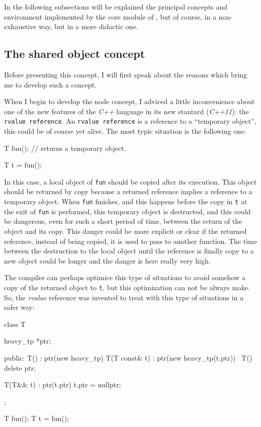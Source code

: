 \documentclass{article}
\begin{document}
In the following subsections will be explained the principal concepts and
environment implemented by the core module of \fav, but of course, in a
non-exhaustive way, but in a more didactic one.

\subsection{The shared object concept}
Before presenting this concept, I will first speak about the reasons which bring
me to develop such a concept.

When I begin to develop the node concept, I adviced a little inconvenience about
one of the new features of the \textit{C++} language in its new stantard
(\textit{C++11}): the \texttt{rvalue reference}. An \texttt{rvalue reference} is a
reference to a ``temporary object'', this could be of course yet alive. The most
typic situation is the following one:

\begin{Cpp}
  T fun();
  // returns a temporary object.

  T t = fun();
\end{Cpp}

In this case, a local object of \texttt{fun} should be copied after its
execution. This object should be returned by copy because a returned reference
implies a reference to a temporary object. When \texttt{fun} finishes, and this
happens before the copy in \texttt{t} at the exit of \texttt{fun} is performed,
this temporary object is destructed, and this could be dangerous, even for such
a short period of time, between the return of the object and its copy. This
danger could be more explicit or clear if the returned reference, instead of
being copied, it is used to pass to another function. The time between the
destruction to the local object until the reference is finally copy to a new
object could be longer and the danger is here really very high.

The compiler can perhaps optimice this type of situations to avoid somehow a
copy of the returned object to \texttt{t}, but this optimization can not be
always make. So, the \textit{rvalue} reference was invented to treat with this
type of situations in a safer way:

\begin{Cpp}
   class T {
      heavy_tp *ptr;

   public:
      T() : ptr(new heavy_tp) {}
      T(T const& t) : ptr(new heavy_tp(t.ptr)) {}
      ~T() { delete ptr; }

      T(T&& t) : ptr(t.ptr)
      {
         t.ptr = nullptr;
      }
   };

   T fun();
   T t = fun();
\end{Cpp}
\end{document}
